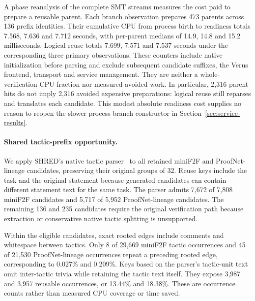 \documentclass[10pt,twocolumn]{article}
\begin{document}
A phase reanalysis of the complete SMT streams measures the cost paid to
prepare a reusable parent. Each branch observation prepares 473 parents across
136 prefix identities. Their cumulative CPU from process birth to readiness
totals 7.568, 7.636 and 7.712 seconds, with per-parent medians of 14.9, 14.8
and 15.2 milliseconds. Logical reuse totals 7.699, 7.571 and 7.537 seconds
under the corresponding three primary observations. These counters include native
initialization before parsing and exclude subsequent candidate suffixes,
the Verus frontend, transport and service management. They are neither a
whole-verification CPU fraction nor measured avoided work. In particular,
2,316 parent hits do not imply 2,316 avoided expensive preparations: logical
reuse still reparses and translates each candidate. This modest absolute
readiness cost supplies no reason to reopen the slower process-branch
constructor in Section~\ref{sec:service-results}.

\paragraph{Shared tactic-prefix opportunity.}
We apply SHRED's native tactic parser~\cite{shred} to all retained miniF2F and
ProofNet-lineage candidates, preserving their original groups of 32.
Reuse keys include the task and the original statement because generated
candidates can contain different statement text for the same task.
The parser admits 7,672 of 7,808 miniF2F candidates and 5,717 of 5,952
ProofNet-lineage candidates. The remaining 136 and 235 candidates require
the original verification path because extraction or conservative native
tactic splitting is unsupported.

Within the eligible candidates, exact rooted edges include comments and
whitespace between tactics. Only 8 of 29,669 miniF2F tactic occurrences and
45 of 21,530 ProofNet-lineage occurrences repeat a preceding rooted edge,
corresponding to 0.027\% and 0.209\%.
Keys based on the parser's tactic-unit text omit inter-tactic trivia while
retaining the tactic text itself. They expose 3,987 and 3,957 reusable
occurrences, or 13.44\% and 18.38\%.
These are occurrence counts rather than measured CPU coverage or time saved.
\end{document}
